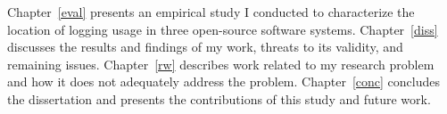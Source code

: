 Chapter~\ref{eval} presents an empirical study I conducted to characterize the location of logging usage in three open-source software systems. Chapter~\ref{diss} discusses the results and findings of my work, threats to its validity, and remaining issues. Chapter~\ref{rw} describes work related to my research problem and how it does not adequately address the problem. Chapter~\ref{conc} concludes the dissertation and presents the contributions of this study and future work. %





